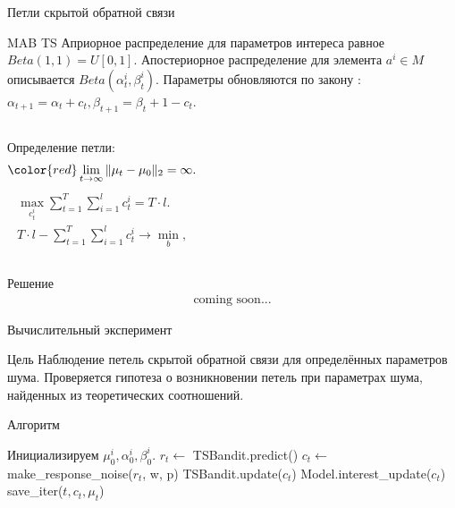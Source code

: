 \documentclass{beamer}
\begin{document}
\begin{frame}{Петли скрытой обратной связи}
  \begin{block}{MAB TS}
Априорное распределение для параметров интереса равное $Beta(1, 1) = U[0, 1]$. 
Апостериорное распределение для элемента $a^i \in M$ описывается $Beta(\alpha_t^i, \beta_t^i)$. 
Параметры обновляются по закону :
$\alpha_{t+1} = \alpha_t + c_t, \beta_{t+1} = \beta_t + 1 - c_t$.
\end{block}
\begin{columns}[c]
  Определение петли:
\begin{gather*}
  \color{red} \lim_{t \to \infty} \|\mu_t - \mu_0 \|_2 = \infty.
\end{gather*}
\begin{gather*}  
\max_{c_t^i} \sum_{t = 1}^T \sum_{i = 1}^l c_t^i = T \cdot l.\\ 
   T \cdot l - \sum_{t = 1}^T \sum_{i = 1}^l c_t^i \to \min_{b}, 
\end{gather*}
\end{columns}
\end{frame}
\begin{frame}{Решение}
  \begin{gather*}
    \text{coming soon...}
  \end{gather*}
\end{frame}
\begin{frame}{Вычислительный эксперимент}
\begin{block}{Цель}
Наблюдение петель скрытой обратной связи для определённых параметров шума. 
Проверяется гипотеза о возникновении петель при параметрах шума, найденных из теоретических соотношений. 
\end{block}

\begin{block}{Алгоритм}
\begin{algorithmic}
  \STATE Инициализируем $\mu_0^i, \alpha_0^i, \beta_0^i$.
    \STATE $r_t \leftarrow$ TSBandit.predict()
    \STATE $c_t \leftarrow$ make\_response\_noise($r_t$, w, p)
    \STATE TSBandit.update($c_t$)
    \STATE Model.interest\_update($c_t$)
    \STATE save\_iter($t, c_t, \mu_t$)
  \ENDFOR
\end{algorithmic}
\end{block}

\end{frame}
\end{document}
